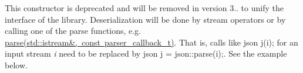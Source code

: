 
\begin{DoxyRefList}
\item[Member \mbox{\hyperlink{classnlohmann_1_1basic__json_a757e90574a742ae9cc54c97422fb3043}{nlohmann::basic\+\_\+json$<$ Object\+Type, Array\+Type, String\+Type, Boolean\+Type, Number\+Integer\+Type, Number\+Unsigned\+Type, Number\+Float\+Type, Allocator\+Type, J\+S\+O\+N\+Serializer $>$::basic\+\_\+json}} (std\+::istream \&i, const parser\+\_\+callback\+\_\+t cb=nullptr)]\label{deprecated__deprecated000001}%
%
This constructor is deprecated and will be removed in version 3.. to unify the interface of the library. Deserialization will be done by stream operators or by calling one of the {\ttfamily parse} functions, e.\+g. \mbox{\hyperlink{classnlohmann_1_1basic__json_a4cd30efe5c33a7cf73a0c6495bb16054}{parse(std\+::istream\&, const parser\+\_\+callback\+\_\+t)}}. That is, calls like {\ttfamily json j(i);} for an input stream {\itshape i} need to be replaced by {\ttfamily json j = json\+::parse(i);}. See the example below.
\end{DoxyRefList}
